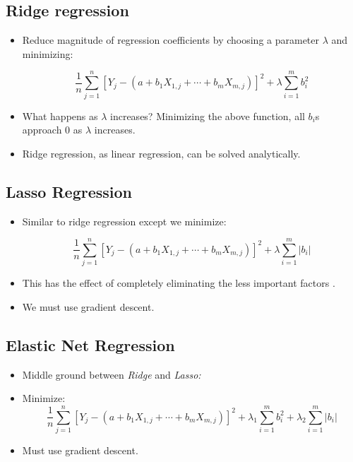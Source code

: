 \subsection{Ridge regression}
\begin{itemize}
    \item Reduce magnitude of regression coefficients by choosing a parameter $\lambda $ and minimizing:
          
          \begin{equation*}
              \frac{1}{n}\sum\limits _{j=1}^{n}\left[ Y_{j} -\left( a+b_{1} X_{1,j} +\cdots +b_{m} X_{m,j}\right)\right]^{2} +\lambda \sum _{i=1}^{m} b_{i}^{2}
          \end{equation*}
    \item What happens as $\lambda $ increases? Minimizing the above function, all $b_{i}$s approach 0 as $\lambda $ increases.
    \item Ridge regression, as linear regression, can be solved analytically.
\end{itemize}
\subsection{Lasso Regression}
\begin{itemize}
    \item Similar to ridge regression except we minimize:
          
          \begin{equation*}
              \frac{1}{n}\sum\limits _{j=1}^{n}\left[ Y_{j} -\left( a+b_{1} X_{1,j} +\cdots +b_{m} X_{m,j}\right)\right]^{2} +\lambda \sum _{i=1}^{m}\left| b_{i}\right| 
          \end{equation*}
    \item This has the effect of completely eliminating the less important factors .
    \item We must use gradient descent.
\end{itemize}
\subsection{Elastic Net Regression}
\begin{itemize}
    \item Middle ground between \textit{Ridge} and \textit{Lasso:}
    \item Minimize:
          \begin{equation*}
              \frac{1}{n}\sum\limits _{j=1}^{n}[ Y_{j} -( a+b_{1} X_{1,j} +\cdots +b_{m} X_{m,j})]^{2} +\lambda _{1}\sum _{i=1}^{m} b_{i}^{2} +\lambda _{2}\sum _{i=1}^{m}| b_{i}| 
          \end{equation*}
    \item Must use gradient descent.
\end{itemize}
